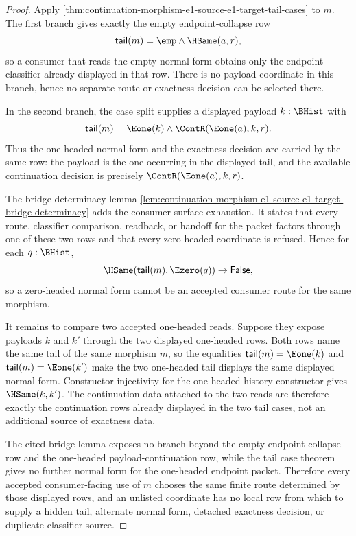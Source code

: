 \begin{proof}
Apply \autoref{thm:continuation-morphism-e1-source-e1-target-tail-cases} to
$m$. The first branch gives exactly the empty endpoint-collapse row
$$
\mathsf{tail}(m)=\emp\land\HSame(a,r),
$$
so a consumer that reads the empty normal form obtains only the endpoint
classifier already displayed in that row. There is no payload coordinate in
this branch, hence no separate route or exactness decision can be selected
there.

In the second branch, the case split supplies a displayed payload $k:\BHist$
with
$$
\mathsf{tail}(m)=\Eone(k)\land\ContR(\Eone(a),k,r).
$$
Thus the one-headed normal form and the exactness decision are carried by the
same row: the payload is the one occurring in the displayed tail, and the
available continuation decision is precisely $\ContR(\Eone(a),k,r)$.

The bridge determinacy lemma
\autoref{lem:continuation-morphism-e1-source-e1-target-bridge-determinacy}
adds the consumer-surface exhaustion. It states that every route, classifier
comparison, readback, or handoff for the packet factors through one of these
two rows and that every zero-headed coordinate is refused. Hence for each
$q:\BHist$,
$$
\HSame(\mathsf{tail}(m),\Ezero(q))\to\mathsf{False},
$$
so a zero-headed normal form cannot be an accepted consumer route for the same
morphism.

It remains to compare two accepted one-headed reads. Suppose they expose
payloads $k$ and $k'$ through the two displayed one-headed rows. Both rows name
the same tail of the same morphism $m$, so the equalities
$\mathsf{tail}(m)=\Eone(k)$ and $\mathsf{tail}(m)=\Eone(k')$ make the two
one-headed tail displays the same displayed normal form. Constructor
injectivity for the one-headed history constructor gives $\HSame(k,k')$. The
continuation data attached to the two reads are therefore exactly the
continuation rows already displayed in the two tail cases, not an additional
source of exactness data.

The cited bridge lemma exposes no branch beyond the empty endpoint-collapse row
and the one-headed payload-continuation row, while the tail case theorem gives
no further normal form for the one-headed endpoint packet. Therefore every
accepted consumer-facing use of $m$ chooses the same finite route determined by
those displayed rows, and an unlisted coordinate has no local row from which to
supply a hidden tail, alternate normal form, detached exactness decision, or
duplicate classifier source.
\end{proof}
